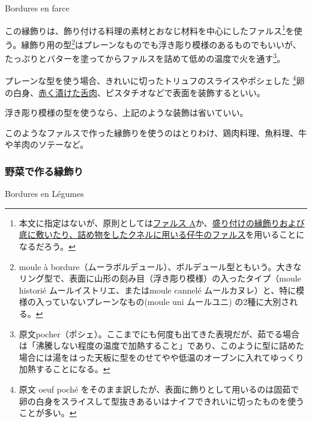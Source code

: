 \begin{recette}
\begin{frsubenv}
Bordures en farce

\end{frsubenv}


この縁飾りは、飾り付ける料理の素材とおなじ材料を中心にしたファルス\footnote{本文に指定はないが、原則としては\protect\hyperlink{farce-a}{ファルス
  A}か、\protect\hyperlink{farce-de-veau-pour-bordures}{盛り付けの縁飾りおよび底に敷いたり、詰め物をしたクネルに用いる仔牛のファルス}を用いることになるだろう。}を使う。縁飾り用の型\footnote{moule
  à
  bordure（ムーラボルデュール）、ボルデュール型ともいう。大きなリング型で、表面に山形の刻み目（浮き彫り模様）の入ったタイプ（moule
  historié ムールイストリエ、またはmoule cannelé
  ムールカヌレ）と、特に模様の入っていないプレーンなもの(moule uni
  ムールユニ) の2種に大別される。}はプレーンなものでも浮き彫り模様のあるものでもいいが、たっぷりとバターを塗ってからファルスを詰めて低めの温度で火を通す\footnote{原文pocher（ポシェ）。ここまでにも何度も出てきた表現だが、茹でる場合は「沸騰しない程度の温度で加熱すること」であり、このように型に詰めた場合には湯をはった天板に型をのせてやや低温のオーブンに入れてゆっくり加熱することになる。}。

プレーンな型を使う場合、きれいに切ったトリュフのスライスやポシェした
\footnote{原文 oeuf poché
  をそのまま訳したが、表面に飾りとして用いるのは固茹で卵の白身をスライスして型抜きあるいはナイフできれいに切ったものを使うことが多い。}卵の白身、\protect\hyperlink{saumure-liquide-pour-langues}{赤く漬けた舌肉}、ピスタチオなどで表面を装飾するといい。

浮き彫り模様の型を使うなら、上記のような装飾は省いていい。

このようなファルスで作った縁飾りを使うのはとりわけ、鶏肉料理、魚料理、牛や羊肉のソテーなど。

\atoaki{}

\hypertarget{bordures-en-legumes}{%
\subsubsection{野菜で作る縁飾り}\label{bordures-en-legumes}}

\begin{frsubenv}

Bordures en Légumes


\end{frsubenv}
\end{recette}
